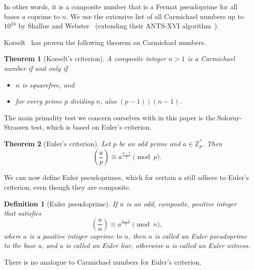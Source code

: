 \documentclass[runningheads]{amsart}
\newtheorem{theorem}{Theorem}
\newtheorem{definition}{Definition}
\newcommand{\Z}{\mathbb{Z}}
\begin{document}
In other words,
it is a composite number that is a Fermat pseudoprime for all bases $a$ coprime to
$n$.
We use the extensive list of all Carmichael numbers up to
$10^{24}$
by Shallue and
Webster~\cite{2025/shallue,2025/webster}
(extending their ANTS-XVI
algorithm~\cite{2024/shallue}).

Korselt~\cite{Korselt1899}
has proven the following theorem on Carmichael numbers.
\begin{theorem}[Korselt's criterion]
A composite integer $n
>
1$ is a Carmichael number if and only if
\begin{itemize}
\item[(i)] $n$ is squarefree, and
\item[(ii)] for every prime $p$ dividing $n$, also $(p-1) \mid (n-1)$.
\end{itemize}
\label{thm: Korselt}
\end{theorem}

The main primality test we concern ourselves with in this paper is the Solovay-Strassen
test,
which is based on Euler's criterion.
\begin{theorem}[Euler's criterion]
Let $p$ be an odd prime and
$a\in
\Z_p^*$.
Then
\[\left( \frac{a}{p}\right) \equiv a^{\frac{p-1}{2}} \pmod{p}.\]
\label{thm:Euler-criterion}
\end{theorem}

We can now define Euler pseudoprimes,
which for certain $a$ still adhere to Euler's criterion,
even though they are composite.

\begin{definition}[Euler pseudoprime]
If $n$ is an odd,
composite,
positive integer that satisfies
\begin{equation}
\left(\frac{a}{n}\right) \equiv a^{\frac{n-1}{2}} \pmod{n},
\label{eq:ProofSSAssumption}
\end{equation}
where $a$ is a positive integer coprime to $n$,
then $n$ is called an Euler pseudoprime to the base $a$,
and $a$ is called an Euler liar,
otherwise $a$ is called an Euler witness.
\end{definition}

\relax

There is no analogue to Carmichael numbers for Euler's criterion.
\end{document}
